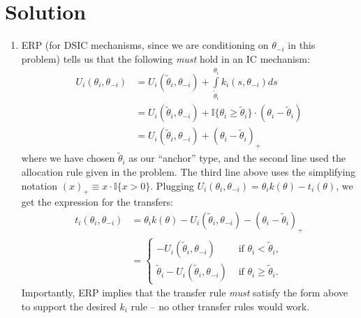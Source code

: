 \documentclass[a4paper]{article}
\newif\ifsolutions
\begin{document}
\ifsolutions
\section*{Solution}

\begin{enumerate}
	\item ERP (for DSIC mechanisms, since we are conditioning on $\theta_{-i}$ in this problem) tells us that the following \emph{must} hold in an IC mechanism:
	\begin{align*}
		U_i(\theta_i,\theta_{-i}) 
		&= U_i(\tilde{\theta}_i, \theta_{-i}) + \int\limits_{\tilde{\theta}_i}^{\theta_i} k_i(s,\theta_{-i}) ds
		\\
		&= U_i(\tilde{\theta}_i, \theta_{-i}) + \mathbb{I}\{\theta_i \geq \tilde{\theta}_i \} \cdot (\theta_i - \tilde{\theta}_i)
		\\
		&= U_i(\tilde{\theta}_i, \theta_{-i}) + (\theta_i - \tilde{\theta}_i)_+
	\end{align*}
	where we have chosen $\tilde{\theta}_i$ as our ``anchor'' type, and the second line used the allocation rule given in the problem. The third line above uses the simplifying notation $(x)_+ \equiv x \cdot \mathbb{I}\{x > 0\}$. Plugging $U_i(\theta_i,\theta_{-i}) = \theta_i k(\theta) - t_i(\theta)$, we get the expression for the transfers:
	\begin{align*}
		t_i(\theta_i, \theta_{-i}) 
		&= \theta_i k(\theta) - U_i(\tilde{\theta}_i, \theta_{-i}) - (\theta_i - \tilde{\theta}_i)_+
		\\
		&= \begin{cases}
			- U_i(\tilde{\theta}_i, \theta_{-i}) & \text{ if } \theta_i < \tilde{\theta}_i,
			\\
			\tilde{\theta}_i - U_i(\tilde{\theta}_i, \theta_{-i}) & \text{ if } \theta_i \geq \tilde{\theta}_i.
		\end{cases}
	\end{align*}
	Importantly, ERP implies that the transfer rule \emph{must} satisfy the form above to support the desired $k_i$ rule -- no other transfer rules would work.
	

\end{enumerate}
\end{document}
